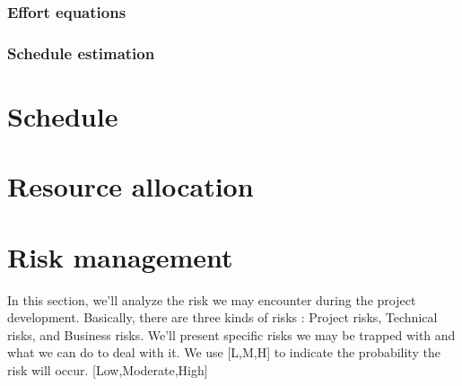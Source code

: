 \documentclass{article}
\begin{document}
	\subsubsection{Effort equations}
	\subsubsection{Schedule estimation}
\newpage

\section{Schedule}

\newpage

\section{Resource allocation}

\newpage

\section{Risk management}
In this section, we'll analyze the risk we may encounter during the project development. Basically, there are three kinds of risks : Project risks, Technical risks, and Business risks. We'll present specific risks we may be trapped with and what we can do to deal with it. We use [L,M,H] to indicate the probability the risk will occur. [Low,Moderate,High]\\
\end{document}
